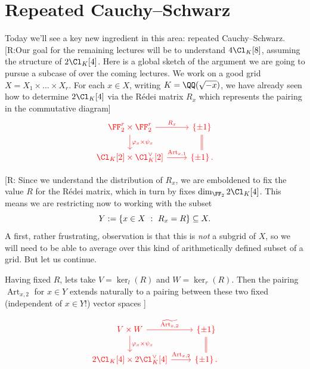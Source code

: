 \documentclass{lecturenotes}
\newcommand{\ross}[1]{{\color{red}[R:#1]}}
\newcommand{\Art}{\operatorname{Art}}
\newcommand{\kerl}{\ker_{l}}
\newcommand{\kerr}{\ker_{r}}
\numberwithin{equation}{section}
\begin{document}
\section{Repeated Cauchy--Schwarz}
Today we'll see a key new ingredient in this area:  repeated Cauchy--Schwarz.  
\ross{Our goal for the remaining lectures will be to understand $4\Cl_K[8]$, assuming the structure of $2\Cl_K[4]$.  Here is a global sketch of the argument we are going to pursue a subcase of over the coming lectures.  We work on a good grid $X=X_1\times\dots\times X_r$.  For each $x\in X$, writing $K=\QQ(\sqrt{-x})$, we have already seen how to determine $2\Cl_K[4]$ via the R\'edei matrix $R_x$ which represents the pairing in the commutative diagram}
\[\begin{tikzcd}[color=red]
    \FF_2^r\times \FF_2^r\ar[r,"R_x"]\ar[d,"\varphi_x\times \psi_x"]&\set{\pm 1}\ar[d,equals]\\
    \Cl_K[2]\times \Cl_K^\vee[2]\ar[r,"\Art_{x,1}"]&\set{\pm 1}.
\end{tikzcd}\]
\ross{
Since we understand the distribution of $R_x$, we are emboldened to fix the value $R$ for the R\'edei matrix, which in turn by \Cref{thm:4torsRedeiKernel} fixes $\dim_{\FF_2}2\Cl_K[4]$.  This means we are restricting now to working with the subset 
\[Y:=\left\{{x\in X~:~R_x=R}\right\}\subseteq X.\]
A first, rather frustrating, observation is that this is \emph{not} a subgrid of $X$, so we will need to be able to average over this kind of arithmetically defined subset of a grid.  But let us continue.

Having fixed $R$, lets take $V=\kerl(R)$ and $W=\kerr(R)$.  Then the pairing $\Art_{x,2}$ for $x\in Y$ extends naturally to a pairing between these two fixed (independent of $x\in Y$!) vector spaces
}
\[\begin{tikzcd}[color=red]
    V\times W\ar[r,"\widetilde{\Art_{x,2}}"]\ar[d,"\varphi_x\times \psi_x"]&\set{\pm 1}\ar[d,equals]\\
    2\Cl_K[4]\times 2\Cl_K^\vee[4]\ar[r,"\Art_{x,2}"]&\set{\pm 1}.
\end{tikzcd}\]
\end{document}
